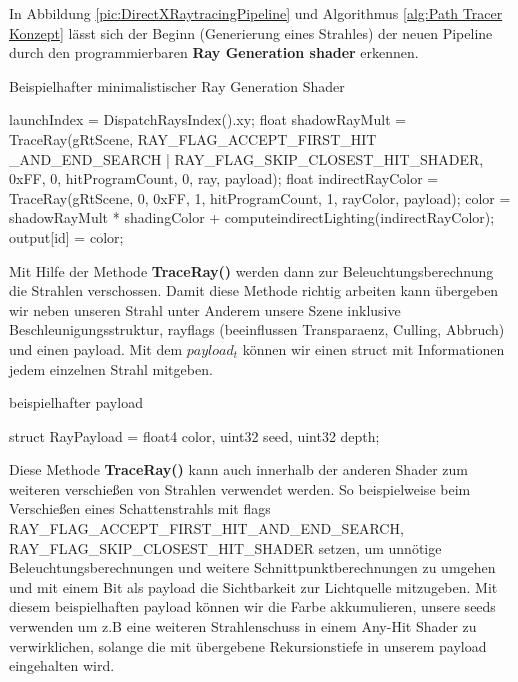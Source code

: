 In Abbildung \ref{pic:DirectXRaytracingPipeline} und  Algorithmus \ref{alg:Path Tracer Konzept} lässt sich
der Beginn (Generierung eines Strahles) der neuen Pipeline durch den programmierbaren
\textbf{Ray Generation shader} erkennen.

\begin{algorithm}[H]
    \caption{Beispielhafter minimalistischer Ray Generation Shader}
    \begin{algorithmic}[1]
        \State launchIndex = DispatchRaysIndex().xy;
            \State float shadowRayMult = TraceRay(gRtScene,
            RAY\_FLAG\_ACCEPT\_FIRST\_HIT \_AND\_END\_SEARCH |
            RAY\_FLAG\_SKIP\_CLOSEST\_HIT\_SHADER,
            0xFF, 0, hitProgramCount, 0, ray, payload);
            \State float indirectRayColor = TraceRay(gRtScene, 0, 0xFF, 1, hitProgramCount, 1, rayColor, payload);
            \State color = shadowRayMult * shadingColor + computeindirectLighting(indirectRayColor);
        \EndFor
        \State output[id] = color;
    \end{algorithmic}
    \label{alg:Ray Gen}
\end{algorithm}

Mit Hilfe der Methode \textbf{TraceRay()} werden dann zur Beleuchtungsberechnung 
die Strahlen verschossen. Damit diese Methode richtig arbeiten kann übergeben wir neben unseren Strahl 
unter Anderem  unsere Szene inklusive Beschleunigungsstruktur, rayflags 
(beeinflussen Transparaenz, Culling, Abbruch)\cite{RayFlags} und einen payload.
Mit dem \textit{$payload_t$} können wir einen struct mit Informationen jedem einzelnen Strahl mitgeben.

\begin{algorithm}[H]
    \caption{beispielhafter payload}
    \begin{algorithmic}[1]
        \State struct RayPayload = {float4 color, uint32 seed, uint32 depth};        
        \end{algorithmic}
        \label{alg:payload}
    \end{algorithm}
    
Diese Methode \textbf{TraceRay()} kann auch innerhalb der anderen Shader zum weiteren verschießen
von Strahlen verwendet werden. So beispielweise beim Verschießen eines Schattenstrahls mit flags 
RAY\_FLAG\_ACCEPT\_FIRST\_HIT\_AND\_END\_SEARCH, \newline
RAY\_FLAG\_SKIP\_CLOSEST\_HIT\_SHADER setzen, um unnötige 
Beleuchtungsberechnungen und weitere Schnittpunktberechnungen zu umgehen und mit einem Bit als payload 
die Sichtbarkeit zur Lichtquelle mitzugeben.
Mit diesem beispielhaften payload können wir die Farbe akkumulieren, unsere  
seeds verwenden um z.B eine weiteren Strahlenschuss in einem Any-Hit Shader zu verwirklichen,  
solange die mit übergebene Rekursionstiefe in unserem payload eingehalten wird.  


